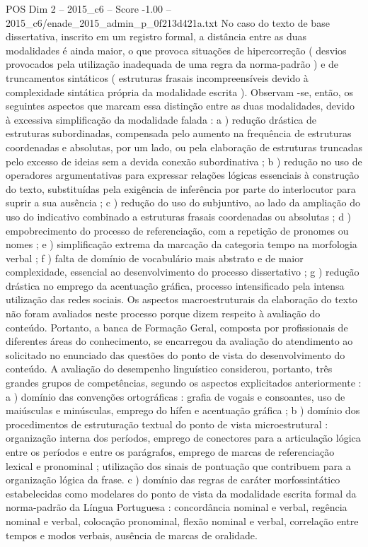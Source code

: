 \begin{textsample}{POS Dim 2 – 2015\_c6 – Score -1.00 – 2015\_c6/enade\_2015\_admin\_p\_0f213d421a.txt}
No caso do texto de base dissertativa, inscrito em um registro formal, a distância entre as duas modalidades é ainda maior, o que provoca situações de hipercorreção ( desvios provocados pela utilização inadequada de uma regra da norma-padrão ) e de truncamentos sintáticos ( estruturas frasais incompreensíveis devido à complexidade sintática própria da modalidade escrita ).
Observam -se, então, os seguintes aspectos que marcam essa distinção entre as duas modalidades, devido à excessiva simplificação da modalidade falada : a ) redução drástica de estruturas subordinadas, compensada pelo aumento na frequência de estruturas coordenadas e absolutas, por um lado, ou pela elaboração de estruturas truncadas pelo excesso de ideias sem a devida conexão subordinativa ; b ) redução no uso de operadores argumentativas para expressar relações lógicas essenciais à construção do texto, substituídas pela exigência de inferência por parte do interlocutor para suprir a sua ausência ; c ) redução do uso do subjuntivo, ao lado da ampliação do uso do indicativo combinado a estruturas frasais coordenadas ou absolutas ; d ) empobrecimento do processo de referenciação, com a repetição de pronomes ou nomes ; e ) simplificação extrema da marcação da categoria tempo na morfologia verbal ; f ) falta de domínio de vocabulário mais abstrato e de maior complexidade, essencial ao desenvolvimento do processo dissertativo ; g ) redução drástica no emprego da acentuação gráfica, processo intensificado pela intensa utilização das redes sociais.
Os aspectos macroestruturais da elaboração do texto não foram avaliados neste processo porque dizem respeito à avaliação do conteúdo.
Portanto, a banca de Formação Geral, composta por profissionais de diferentes áreas do conhecimento, se encarregou da avaliação do atendimento ao solicitado no enunciado das questões do ponto de vista do desenvolvimento do conteúdo.
A avaliação do desempenho linguístico considerou, portanto, três grandes grupos de competências, segundo os aspectos explicitados anteriormente : a ) domínio das convenções ortográficas : grafia de vogais e consoantes, uso de maiúsculas e minúsculas, emprego do hífen e acentuação gráfica ; b ) domínio dos procedimentos de estruturação textual do ponto de vista microestrutural : organização interna dos períodos, emprego de conectores para a articulação lógica entre os períodos e entre os parágrafos, emprego de marcas de referenciação lexical e pronominal ; utilização dos sinais de pontuação que contribuem para a organização lógica da frase. c ) domínio das regras de caráter morfossintático estabelecidas como modelares do ponto de vista da modalidade escrita formal da norma-padrão da Língua Portuguesa : concordância nominal e verbal, regência nominal e verbal, colocação pronominal, flexão nominal e verbal, correlação entre tempos e modos verbais, ausência de marcas de oralidade.

\end{textsample}
